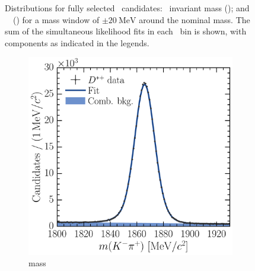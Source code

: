 \begin{figure}
\begin{subfigure}[b]{0.5\textwidth}
    \caption{\lnipchisq}
    \label{fig:prod:fitting:DsToKKpi:ipchisq}
  \end{subfigure}
  \caption{%
    Distributions for fully selected \DspTophipi\ candidates: \PDsplus\ 
    invariant mass (); and \PDsplus\ 
    \lnipchisq\ () for a mass 
    window of $\pm\SI{20}{\MeV}$ around the nominal \PDsplus mass.
    The sum of the simultaneous likelihood fits in each \pTy\ bin is shown, 
    with components as indicated in the legends.
  }
  \label{fig:prod:fitting:DsToKKpi}
\end{figure}

\begin{figure}
  \begin{subfigure}[b]{0.5\textwidth}
    \centering
    \includegraphics[width=\textwidth]{figures/production/fitting/DstToD0pi_D0ToKpi_mass_fit_pT_integrated_y_integrated}
    \caption{\PDzero mass}
    \label{fig:prod:fitting:DstToD0pi_D0ToKpi:mass}
  \end{subfigure}
  \begin{subfigure}[b]{0.5\textwidth}
    \centering

\end{subfigure}
\end{figure}
